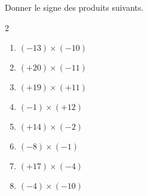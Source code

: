 \begin{exercice*}
    Donner le signe des produits suivants.
    \begin{multicols}2
        \begin{enumerate}
            \item $ (-13) \times (-10) $
            \item $ (+20) \times (-11) $
            \item $ (+19) \times (+11) $
            \item $ (-1) \times (+12) $
            \item $ (+14) \times (-2) $
            \item $ (-8) \times (-1) $
            \item $ (+17) \times (-4) $
            \item $ (-4) \times (-10) $
        \end{enumerate}
    \end{multicols}

\end{exercice*}
